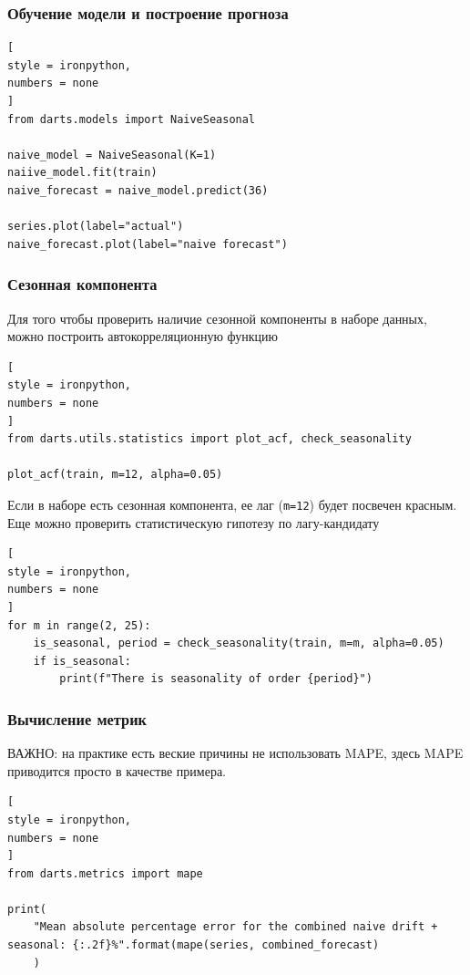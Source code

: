\documentclass[%
	11pt,
	a4paper,
	utf8,
		]{article}
\begin{document}
\subsubsection{Обучение модели и построение прогноза}

\begin{lstlisting}[
style = ironpython,
numbers = none
]
from darts.models import NaiveSeasonal

naive_model = NaiveSeasonal(K=1)
naiive_model.fit(train)
naive_forecast = naive_model.predict(36)

series.plot(label="actual")
naive_forecast.plot(label="naive forecast")
\end{lstlisting}

\subsubsection{Сезонная компонента}

Для того чтобы проверить наличие сезонной компоненты в наборе данных, можно построить автокорреляционную функцию
\begin{lstlisting}[
style = ironpython,
numbers = none
]
from darts.utils.statistics import plot_acf, check_seasonality

plot_acf(train, m=12, alpha=0.05)
\end{lstlisting}

Если в наборе есть сезонная компонента, ее лаг (\verb|m=12|) будет посвечен красным. Еще можно проверить статистическую гипотезу по лагу-кандидату
\begin{lstlisting}[
style = ironpython,
numbers = none
]
for m in range(2, 25):
    is_seasonal, period = check_seasonality(train, m=m, alpha=0.05)
    if is_seasonal:
        print(f"There is seasonality of order {period}")
\end{lstlisting}

\subsubsection{Вычисление метрик}

ВАЖНО: на практике есть веские причины {\color{red}не использовать MAPE}, здесь MAPE приводится просто в качестве примера.

\begin{lstlisting}[
style = ironpython,
numbers = none
]
from darts.metrics import mape

print(
    "Mean absolute percentage error for the combined naive drift + seasonal: {:.2f}%".format(mape(series, combined_forecast)
    )
\end{lstlisting}
\end{document}
